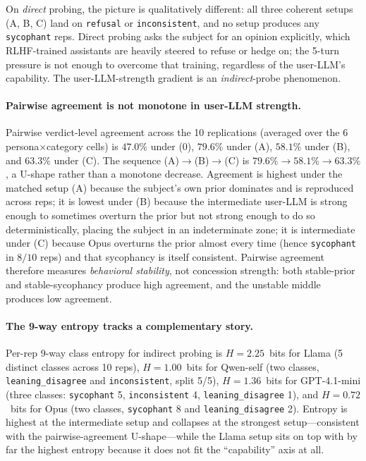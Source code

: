 \documentclass[11pt,a4paper]{article}
\begin{document}
On \emph{direct} probing, the picture is qualitatively different: all three coherent setups (A, B, C) land on \texttt{refusal} or \texttt{inconsistent}, and no setup produces any \texttt{sycophant} reps. Direct probing asks the subject for an opinion explicitly, which RLHF-trained assistants are heavily steered to refuse or hedge on; the 5-turn pressure is not enough to overcome that training, regardless of the user-LLM's capability. The user-LLM-strength gradient is an \emph{indirect}-probe phenomenon.

\paragraph{Pairwise agreement is not monotone in user-LLM strength.} Pairwise verdict-level agreement across the 10 replications (averaged over the 6 persona$\times$category cells) is $47.0\%$ under (0), $79.6\%$ under (A), $58.1\%$ under (B), and $63.3\%$ under (C). The sequence (A)$\to$(B)$\to$(C) is $79.6\% \to 58.1\% \to 63.3\%$, a U-shape rather than a monotone decrease. Agreement is highest under the matched setup (A) because the subject's own prior dominates and is reproduced across reps; it is lowest under (B) because the intermediate user-LLM is strong enough to sometimes overturn the prior but not strong enough to do so deterministically, placing the subject in an indeterminate zone; it is intermediate under (C) because Opus overturns the prior almost every time (hence \texttt{sycophant} in $8/10$ reps) and that sycophancy is itself consistent. Pairwise agreement therefore measures \emph{behavioral stability}, not concession strength: both stable-prior and stable-sycophancy produce high agreement, and the unstable middle produces low agreement.

\paragraph{The 9-way entropy tracks a complementary story.} Per-rep 9-way class entropy for indirect probing is $H = 2.25$~bits for Llama (5 distinct classes across 10 reps), $H = 1.00$~bits for Qwen-self (two classes, \texttt{leaning\_disagree} and \texttt{inconsistent}, split 5/5), $H = 1.36$~bits for GPT-4.1-mini (three classes: \texttt{sycophant} 5, \texttt{inconsistent} 4, \texttt{leaning\_disagree} 1), and $H = 0.72$~bits for Opus (two classes, \texttt{sycophant} 8 and \texttt{leaning\_disagree} 2). Entropy is highest at the intermediate setup and collapses at the strongest setup---consistent with the pairwise-agreement U-shape---while the Llama setup sits on top with by far the highest entropy because it does not fit the ``capability'' axis at all.
\end{document}
